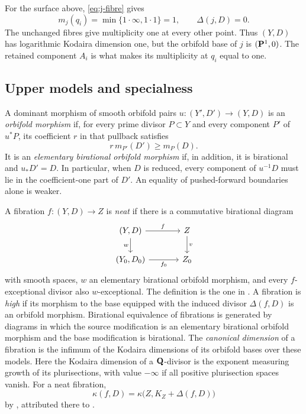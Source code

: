 For the surface above, \eqref{eq:j-fibre} gives
\begin{equation}\label{eq:j-base-zero}
 m_j(q_i)=\min\{1\cdot\infty,1\cdot1\}=1,
 \qquad \Delta(j,D)=0.
\end{equation}
The unchanged fibres give multiplicity one at every other point. Thus
$(Y,D)$ has logarithmic Kodaira dimension one, but the orbifold base of
$j$ is $(\mathbf P^1,0)$. The retained component $A_i$ is what makes
its multiplicity at $q_i$ equal to one.

\subsection{Upper models and specialness}
A dominant morphism of smooth orbifold pairs $u:(Y',D')\to(Y,D)$ is an
\emph{orbifold morphism} if, for every prime divisor $P\subset Y$ and
every component $P'$ of $u^*P$, its coefficient $r$ in that pullback
satisfies
\[
 r\,m_{P'}(D')\geq m_P(D).
\]
It is an \emph{elementary birational orbifold morphism} if, in addition,
it is birational and $u_*D'=D$. In particular, when $D$ is reduced, every
component of $u^{-1}D$ must lie in the coefficient-one part of $D'$.
An equality of pushed-forward boundaries alone is weaker.

A fibration $f:(Y,D)\to Z$ is \emph{neat} if there is a commutative
birational diagram
\[
\begin{tikzcd}[column sep=large]
 (Y,D) \arrow[r,"f"] \arrow[d,"w"'] & Z \arrow[d,"v"]\\
 (Y_0,D_0) \arrow[r,"f_0"'] & Z_0
\end{tikzcd}
\]
with smooth spaces, $w$ an elementary birational orbifold morphism, and every $f$-exceptional divisor also $w$-exceptional. The
definition is the one in \cite[Definition 2.3]{CDHP2026}. A fibration is
\emph{high} if its morphism to the base equipped with the induced divisor
$\Delta(f,D)$ is an orbifold morphism. Birational equivalence of
fibrations is generated by diagrams in which the source modification is
an elementary birational orbifold morphism and the base modification is
birational. The \emph{canonical dimension} of a fibration is the infimum
of the Kodaira dimensions of its orbifold bases over these models. Here
the Kodaira dimension of a $\mathbf Q$-divisor is the exponent measuring growth
of its plurisections, with value $-\infty$ if all positive plurisection
spaces vanish. For a neat fibration,
\begin{equation}\label{eq:neat-kappa}
 \kappa(f,D)=\kappa\bigl(Z,K_Z+\Delta(f,D)\bigr)
\end{equation}
by \cite[Lemma 2.7]{CDHP2026}, attributed there to
\cite[Corollaire 5.11(3)]{Campana2011}.

